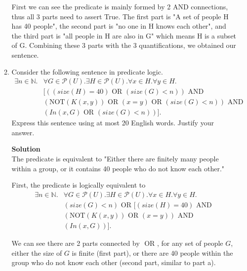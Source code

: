 \documentclass[12pt]{article}
\newcommand{\nnot}{\mathrm{NOT}}
\newcommand{\aand}{\,\,\mathrm{AND}\,\,}
\newcommand{\oor}{\,\,\mathrm{OR}\,\,}
\newcommand{\iimplies}{\,\,\mathrm{IMPLIES}\,\,}
\begin{document}
\begin{enumerate}
\begin{enumerate}
First we can see the predicate is mainly formed by 2 AND connections, thus all 3 parts need to assert True. The first part is "A set of people H has 40 people", the second part is "no one in H knows each other", and the third part is "all people in H are also in G" which means H is a subset of G. Combining these 3 parts with the 3 quantifications, we obtained our sentence. 

\item
Consider the following sentence in predicate logic.
\begin{align*}
\exists n \in \mathbb{N}. & \forall G \in \mathcal{P}(U). \exists H \in \mathcal{P}(U). \forall x \in H. \forall y \in H.\\
& [((size(H)= 40) \oor  (size(G)  < n)) \aand \\ & (\nnot(K(x,y)) \oor (x=y) \oor (size(G)  < n)) \aand \\ & (In(x ,G) \oor  (size(G)  < n))].
\end{align*}
Express this sentence using at most 20 English words.
Justify your answer. 
 
\vspace{.25in}\textbf{Solution}\vspace{.10in}\\

The predicate is equivalent to "Either there are finitely many people within a group, or it contains 40 people who do not know each other."

First, the predicate is logically equivalent to \begin{align*}
\exists n \in \mathbb{N}. & \forall G \in \mathcal{P}(U). \exists H \in \mathcal{P}(U). \forall x \in H. \forall y \in H.\\
& (size(G)  < n) \oor [(size(H) = 40) \aand \\ & (\nnot(K(x,y)) \oor (x=y)) \aand \\ & (In(x ,G))].
\end{align*}

We can see there are 2 parts connected by $\oor$, for any set of people $G$, either the size of $G$ is finite (first part), or there are 40 people within the group who do not know each other (second part, similar to part a). 




\end{enumerate}
\end{enumerate}
\end{document}
